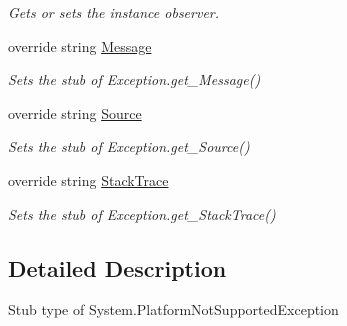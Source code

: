 \begin{DoxyCompactItemize}
\begin{DoxyCompactList}\small\item\em Gets or sets the instance observer.\end{DoxyCompactList}\item 
override string \hyperlink{class_system_1_1_fakes_1_1_stub_platform_not_supported_exception_aea7b0edbcaa705f27b2ffe7993d67b57}{Message}
\begin{DoxyCompactList}\small\item\em Sets the stub of Exception.\-get\-\_\-\-Message()\end{DoxyCompactList}\item 
override string \hyperlink{class_system_1_1_fakes_1_1_stub_platform_not_supported_exception_a10c3402c4ef61786b4d0824a8fc7f87e}{Source}
\begin{DoxyCompactList}\small\item\em Sets the stub of Exception.\-get\-\_\-\-Source()\end{DoxyCompactList}\item 
override string \hyperlink{class_system_1_1_fakes_1_1_stub_platform_not_supported_exception_a8c1c78ac47a5dba46dbffdc1a3d35ce7}{Stack\-Trace}
\begin{DoxyCompactList}\small\item\em Sets the stub of Exception.\-get\-\_\-\-Stack\-Trace()\end{DoxyCompactList}\end{DoxyCompactItemize}


\subsection{Detailed Description}
Stub type of System.\-Platform\-Not\-Supported\-Exception



